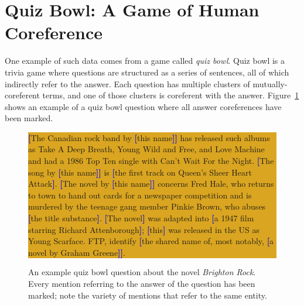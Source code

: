 
\section{Quiz Bowl: A Game of Human Coreference}
\label{sec:qb-data}

One example of such data comes from a game called \emph{quiz bowl}.  Quiz bowl
is a trivia game where questions are structured as a series of sentences, all of
which indirectly refer to the answer. Each question has multiple clusters of
mutually-coreferent terms, and one of those clusters is coreferent with the
answer. Figure~\ref{fig:qbexample} shows an example of a quiz bowl question
where all answer coreferences have been marked.

\begin{figure}[t]
\footnotesize{ \colorbox{Goldenrod}{\parbox{0.97\linewidth}{ \textcolor{blue}{\textbf{\textcolor{blue}{\textbf{[}}}}The Canadian rock band by \textcolor{blue}{\textbf{[}}this name\textcolor{blue}{\textbf{]}}\textcolor{blue}{\textbf{]}} has released such albums as Take A Deep Breath, Young Wild and Free, and Love Machine and had a 1986 Top Ten single with Can't Wait For the Night. \textcolor{blue}{\textbf{[}}The song by \textcolor{blue}{\textbf{[}}this name\textcolor{blue}{\textbf{]}}\textcolor{blue}{\textbf{]}} is \textcolor{blue}{\textbf{[}}the first track on Queen's Sheer Heart Attack\textcolor{blue}{\textbf{]}}. \textcolor{blue}{\textbf{[}}The novel by \textcolor{blue}{\textbf{[}}this name\textcolor{blue}{\textbf{]}}\textcolor{blue}{\textbf{]}} concerns Fred Hale, who returns to town to hand out cards for a newspaper competition and is murdered by the teenage gang member Pinkie Brown, who abuses \textcolor{blue}{\textbf{[}}the title substance\textcolor{blue}{\textbf{]}}. \textcolor{blue}{\textbf{[}}The novel\textcolor{blue}{\textbf{]}} was adapted into \textcolor{blue}{\textbf{[}}a 1947 film starring Richard Attenborough\textcolor{blue}{\textbf{]}}; \textcolor{blue}{\textbf{[}}this\textcolor{blue}{\textbf{]}} was released in the US as Young Scarface. FTP, identify \textcolor{blue}{\textbf{[}}the shared name of, most notably, \textcolor{blue}{\textbf{[}}a novel by Graham Greene\textcolor{blue}{\textbf{]}}\textcolor{blue}{\textbf{]}}.}}}

\caption{An example quiz bowl question about the novel \emph{Brighton
    Rock}. Every mention referring to the answer of the question has been
  marked; note the variety of mentions that refer to the same entity.}

\label{fig:qbexample}
\end{figure}

